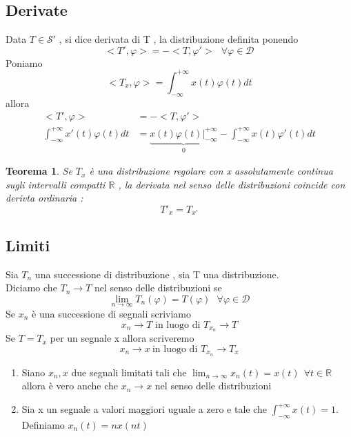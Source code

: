 \documentclass{article}
\newtheorem{teorema}{Teorema}[subsection]
\theoremstyle{definition}
\newcommand{\R}{\mathbb{R}}
\newcommand{\intinf}{\int_{-\infty}^{+\infty}}
\begin{document}
	\subsection{Derivate}
	Data $T \in \mathscr{S}'$  , si dice derivata di T , la distribuzione definita ponendo 
	$$<T',\varphi>=-<T,\varphi'> \ \ \ \forall  \varphi \in \mathscr{D}$$	
	Poniamo $$<T_x,\varphi>=\intinf x(t)\varphi(t)dt$$ allora 
	\begin{align*}
<T',\varphi>&=-<T,\varphi'> \\
\intinf x'(t)\varphi(t)dt&=\underbrace{x(t)\varphi(t)\Bigg|_{-\infty}^{+\infty}}_0-\intinf x(t) \varphi'(t)dt
	\end{align*}
	\begin{teorema}
		Se $T_x$ è una distribuzione regolare con x assolutamente continua sugli intervalli compatti $\R$ , la derivata nel senso delle distribuzioni coincide con  derivta ordinaria : 
		$$T'_x=T_{x'}$$	
		\end{teorema}
		\subsection{Limiti}
		Sia $T_n$ una successione di distribuzione , sia T una distribuzione. \\ Diciamo che $T_n\rightarrow T$ nel senso delle distribuzioni  se 
		$$ \lim_{n \rightarrow \infty}T_n(\varphi)=T(\varphi) \ \ \ \forall \varphi \in \mathscr{D}$$
		Se $x_n$ è una successione di segnali  scriviamo $$x_n \rightarrow T \text{ in luogo di } T_{x_n}\rightarrow T $$ 
		Se $T=T_x$ per un segnale x allora scriveremo 
		$$x_n \rightarrow x\ \text{in luogo di } T_{x_n}\rightarrow T_x $$
			\begin{teo}{}{}
			\begin{enumerate}
				\item Siano $x_n,x$ due segnali limitati tali che $\lim_{n\rightarrow\infty}x_n(t)=x(t) \ \ \forall t \in \R$ allora è vero anche che $x_n \rightarrow x$ nel senso delle distribuzioni	
				\item Sia x un segnale a valori maggiori uguale a zero e tale che $\intinf x(t)=1$.\\Definiamo $x_n(t)=nx(nt)$
			\end{enumerate}
		\end{teo}
\end{document}
